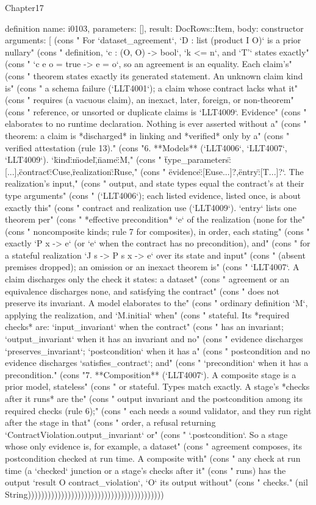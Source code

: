 \begin{lexlean}{Chapter17}
\begin{semanticmodule}
definition{
  name: i0103,
  parameters: [],
  result: DocRows::Item,
  body: constructor{
    arguments: [
      (cons "   For `dataset_agreement`, `D : list (product I O)` is a prior nullary" (cons "   definition, `c : (O, O) -> bool`, `k <= n`, and `T'` states exactly" (cons "   `c e o = true -> e = o`, so an agreement is an equality. Each claim's" (cons "   theorem states exactly its generated statement. An unknown claim kind is" (cons "   a schema failure (`LLT4001`); a claim whose contract lacks what it" (cons "   requires (a vacuous claim), an inexact, later, foreign, or non-theorem" (cons "   reference, or unsorted or duplicate claims is `LLT4009`. Evidence" (cons "   elaborates to no runtime declaration. Nothing is ever asserted without a" (cons "   theorem: a claim is *discharged* in linking and *verified* only by a" (cons "   verified attestation (rule 13)." (cons "6. **Models** (`LLT4006`, `LLT4007`, `LLT4009`). `{\"kind\":\"model\",\"name\":M," (cons "   \"type_parameters\":[...],\"contract\":Cuse,\"realization\":Ruse," (cons "   \"evidence\":[Euse...]?,\"entry\":[T...]?}`. The realization's input," (cons "   output, and state types equal the contract's at their type arguments" (cons "   (`LLT4006`); each listed evidence, listed once, is about exactly this" (cons "   contract and realization use (`LLT4009`). `entry` lists one theorem per" (cons "   *effective precondition* `e` of the realization (none for the" (cons "   noncomposite kinds; rule 7 for composites), in order, each stating" (cons "   exactly `P x -> e` (or `e` when the contract has no precondition), and" (cons "   for a stateful realization `J s -> P s x -> e` over its state and input" (cons "   (absent premises dropped); an omission or an inexact theorem is" (cons "   `LLT4007`. A claim discharges only the check it states: a dataset" (cons "   agreement or an equivalence discharges none, and satisfying the contract" (cons "   does not preserve its invariant. A model elaborates to the" (cons "   ordinary definition `M`, applying the realization, and `M.initial` when" (cons "   stateful. Its *required checks* are: `input_invariant` when the contract" (cons "   has an invariant; `output_invariant` when it has an invariant and no" (cons "   evidence discharges `preserves_invariant`; `postcondition` when it has a" (cons "   postcondition and no evidence discharges `satisfies_contract`; and" (cons "   `precondition` when it has a precondition." (cons "7. **Composition** (`LLT4007`). A composite stage is a prior model, stateless" (cons "   or stateful. Types match exactly. A stage's *checks after it runs* are the" (cons "   output invariant and the postcondition among its required checks (rule 6);" (cons "   each needs a sound validator, and they run right after the stage in that" (cons "   order, a refusal returning `ContractViolation.output_invariant` or" (cons "   `.postcondition`. So a stage whose only evidence is, for example, a dataset" (cons "   agreement composes, its postcondition checked at run time. A composite with" (cons "   any check at run time (a `checked` junction or a stage's checks after it" (cons "   runs) has the output `result O contract_violation`, `O` its output without" (cons "   checks." (nil String)))))))))))))))))))))))))))))))))))))))))
}}
\end{semanticmodule}
\end{lexlean}
